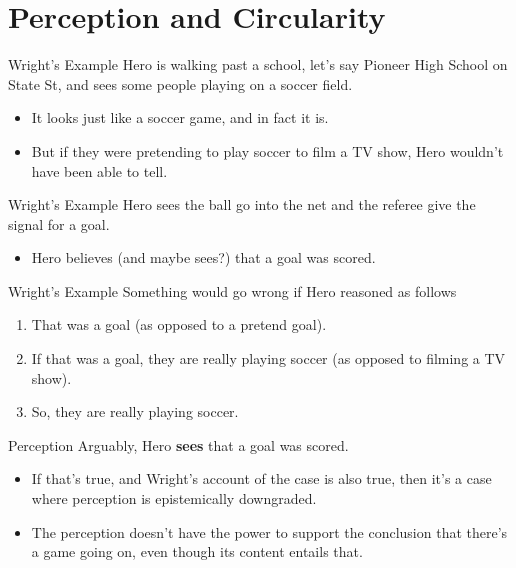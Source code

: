 \documentclass[
  17pt,
  letterpaper,
  ignorenonframetext,
  aspectratio=169,
  handout,
  xcolor={dvipsnames}]{beamer}
\providecommand{\tightlist}{%
  \setlength{\itemsep}{0pt}\setlength{\parskip}{0pt}}\usepackage{longtable,booktabs,array}
\begin{document}
\hypertarget{perception-and-circularity}{%
\section{Perception and Circularity}\label{perception-and-circularity}}

\begin{frame}{Wright's Example}
\protect\hypertarget{wrights-example}{}
Hero is walking past a school, let's say Pioneer High School on State
St, and sees some people playing on a soccer field.

\begin{itemize}[<+->]
\tightlist
\item
  It looks just like a soccer game, and in fact it is.
\item
  But if they were pretending to play soccer to film a TV show, Hero
  wouldn't have been able to tell.
\end{itemize}
\end{frame}

\begin{frame}{Wright's Example}
\protect\hypertarget{wrights-example-1}{}
Hero sees the ball go into the net and the referee give the signal for a
goal.

\begin{itemize}[<+->]
\tightlist
\item
  Hero believes (and maybe sees?) that a goal was scored.
\end{itemize}
\end{frame}

\begin{frame}{Wright's Example}
\protect\hypertarget{wrights-example-2}{}
Something would go wrong if Hero reasoned as follows

\begin{enumerate}[<+->]
\tightlist
\item
  That was a goal (as opposed to a pretend goal).
\item
  If that was a goal, they are really playing soccer (as opposed to
  filming a TV show).
\item
  So, they are really playing soccer.
\end{enumerate}
\end{frame}

\begin{frame}{Perception}
\protect\hypertarget{perception}{}
Arguably, Hero \textbf{sees} that a goal was scored.

\begin{itemize}[<+->]
\tightlist
\item
  If that's true, and Wright's account of the case is also true, then
  it's a case where perception is epistemically downgraded.
\item
  The perception doesn't have the power to support the conclusion that
  there's a game going on, even though its content entails that.
\end{itemize}
\end{frame}
\end{document}
